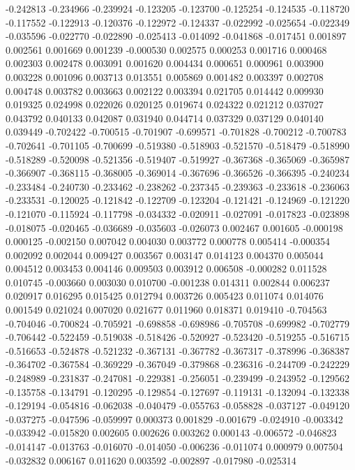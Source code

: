 -0.242813
-0.234966
-0.239924
-0.123205
-0.123700
-0.125254
-0.124535
-0.118720
-0.117552
-0.122913
-0.120376
-0.122972
-0.124337
-0.022992
-0.025654
-0.022349
-0.035596
-0.022770
-0.022890
-0.025413
-0.014092
-0.041868
-0.017451
0.001897
0.002561
0.001669
0.001239
-0.000530
0.002575
0.000253
0.001716
0.000468
0.002303
0.002478
0.003091
0.001620
0.004434
0.000651
0.000961
0.003900
0.003228
0.001096
0.003713
0.013551
0.005869
0.001482
0.003397
0.002708
0.004748
0.003782
0.003663
0.002122
0.003394
0.021705
0.014442
0.009930
0.019325
0.024998
0.022026
0.020125
0.019674
0.024322
0.021212
0.037027
0.043792
0.040133
0.042087
0.031940
0.044714
0.037329
0.037129
0.040140
0.039449
-0.702422
-0.700515
-0.701907
-0.699571
-0.701828
-0.700212
-0.700783
-0.702641
-0.701105
-0.700699
-0.519380
-0.518903
-0.521570
-0.518479
-0.518990
-0.518289
-0.520098
-0.521356
-0.519407
-0.519927
-0.367368
-0.365069
-0.365987
-0.366907
-0.368115
-0.368005
-0.369014
-0.367696
-0.366526
-0.366395
-0.240234
-0.233484
-0.240730
-0.233462
-0.238262
-0.237345
-0.239363
-0.233618
-0.236063
-0.233531
-0.120025
-0.121842
-0.122709
-0.123204
-0.121421
-0.124969
-0.121220
-0.121070
-0.115924
-0.117798
-0.034332
-0.020911
-0.027091
-0.017823
-0.023898
-0.018075
-0.020465
-0.036689
-0.035603
-0.026073
0.002467
0.001605
-0.000198
0.000125
-0.002150
0.007042
0.004030
0.003772
0.000778
0.005414
-0.000354
0.002092
0.002044
0.009427
0.003567
0.003147
0.014123
0.004370
0.005044
0.004512
0.003453
0.004146
0.009503
0.003912
0.006508
-0.000282
0.011528
0.010745
-0.003660
0.003030
0.010700
-0.001238
0.014311
0.002844
0.006237
0.020917
0.016295
0.015425
0.012794
0.003726
0.005423
0.011074
0.014076
0.001549
0.021024
0.007020
0.021677
0.011960
0.018371
0.019410
-0.704563
-0.704046
-0.700824
-0.705921
-0.698858
-0.698986
-0.705708
-0.699982
-0.702779
-0.706442
-0.522459
-0.519038
-0.518426
-0.520927
-0.523420
-0.519255
-0.516715
-0.516653
-0.524878
-0.521232
-0.367131
-0.367782
-0.367317
-0.378996
-0.368387
-0.364702
-0.367584
-0.369229
-0.367049
-0.379868
-0.236316
-0.244709
-0.242229
-0.248989
-0.231837
-0.247081
-0.229381
-0.256051
-0.239499
-0.243952
-0.129562
-0.135758
-0.134791
-0.120295
-0.129854
-0.127697
-0.119131
-0.132094
-0.132338
-0.129194
-0.054816
-0.062038
-0.040479
-0.055763
-0.058828
-0.037127
-0.049120
-0.037275
-0.047596
-0.059997
0.000373
0.001829
-0.001679
-0.024910
-0.003342
-0.033942
-0.015820
0.002605
0.002626
0.003262
0.000143
-0.006572
-0.046823
-0.014147
-0.013763
-0.016070
-0.014050
-0.006236
-0.011074
0.000979
0.007504
-0.032832
0.006167
0.011620
0.003592
-0.002897
-0.017980
-0.025314
